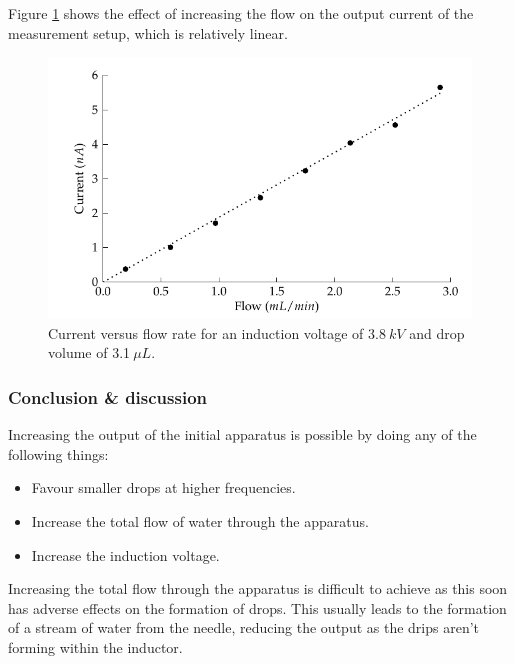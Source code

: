 Figure \ref{Figure_Graph_dripper_currentVsFlow} shows the effect
of increasing the flow on the output current of the measurement setup,
which is relatively linear.

\begin{figure}
\begin{centering}
\includegraphics{content/appendices/chargedWaterDrops/graphics/dripper_currentVsFlow}
\par\end{centering}

\protect\caption{\label{Figure_Graph_dripper_currentVsFlow}Current versus flow rate
for an induction voltage of 3.8$\: kV$ and drop volume of 3.1$\:\mu L$.}
\end{figure}



\subsubsection*{Conclusion \& discussion}

Increasing the output of the initial apparatus is possible by doing
any of the following things:
\begin{itemize}
\item Favour smaller drops at higher frequencies.
\item Increase the total flow of water through the apparatus.
\item Increase the induction voltage.
\end{itemize}
Increasing the total flow through the apparatus is difficult to achieve
as this soon has adverse effects on the formation of drops. This usually
leads to the formation of a stream of water from the needle, reducing
the output as the drips aren't forming within the inductor.

